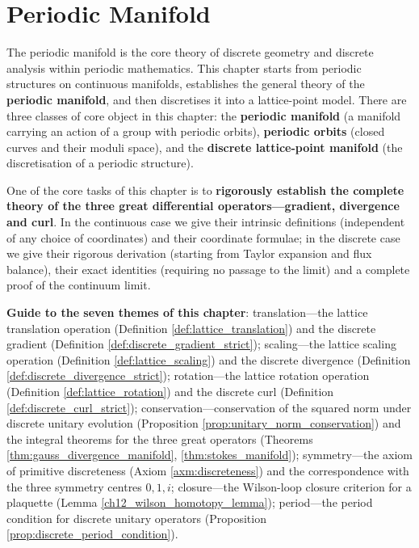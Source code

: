 \chapter{Periodic Manifold}

\begin{remark}\label{rem:periodic_manifold_chapter_positioning}
The periodic manifold is the core theory of discrete geometry and discrete analysis within periodic mathematics. This chapter starts from periodic structures on continuous manifolds, establishes the general theory of the \textbf{periodic manifold}, and then discretises it into a lattice-point model. There are three classes of core object in this chapter: the \textbf{periodic manifold} (a manifold carrying an action of a group with periodic orbits), \textbf{periodic orbits} (closed curves and their moduli space), and the \textbf{discrete lattice-point manifold} (the discretisation of a periodic structure).

One of the core tasks of this chapter is to \textbf{rigorously establish the complete theory of the three great differential operators---gradient, divergence and curl}. In the continuous case we give their intrinsic definitions (independent of any choice of coordinates) and their coordinate formulae; in the discrete case we give their rigorous derivation (starting from Taylor expansion and flux balance), their exact identities (requiring no passage to the limit) and a complete proof of the continuum limit.

\textbf{Guide to the seven themes of this chapter}: translation---the lattice translation operation (Definition \ref{def:lattice_translation}) and the discrete gradient (Definition \ref{def:discrete_gradient_strict}); scaling---the lattice scaling operation (Definition \ref{def:lattice_scaling}) and the discrete divergence (Definition \ref{def:discrete_divergence_strict}); rotation---the lattice rotation operation (Definition \ref{def:lattice_rotation}) and the discrete curl (Definition \ref{def:discrete_curl_strict}); conservation---conservation of the squared norm under discrete unitary evolution (Proposition \ref{prop:unitary_norm_conservation}) and the integral theorems for the three great operators (Theorems \ref{thm:gauss_divergence_manifold}, \ref{thm:stokes_manifold}); symmetry---the axiom of primitive discreteness (Axiom \ref{axm:discreteness}) and the correspondence with the three symmetry centres $0,1,i$; closure---the Wilson-loop closure criterion for a plaquette (Lemma \ref{ch12_wilson_homotopy_lemma}); period---the period condition for discrete unitary operators (Proposition \ref{prop:discrete_period_condition}).
\end{remark}

